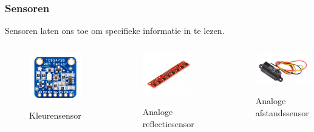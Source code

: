 \documentclass
   [kulak,aspectratio=169,<options>] %
   {kulakbeamer}
\begin{document}
\begin{frame}
	\frametitle{Sensoren}
	Sensoren laten ons toe om specifieke informatie in te lezen.
	\begin{columns}
		\begin{figure}
			\centering
			\includegraphics[width=.7\textwidth]{kleurensensor}
			\caption{Kleurensensor}\cite{TCS34725KleurSensorBOB}
		\end{figure}
		\begin{figure}
			\centering
			\includegraphics[width=.8\textwidth]{reflectiesensor}
			\caption{Analoge reflectiesensor}\cite{QTR-8AAnalogeReflexieSensorArray}
		\end{figure}
		\begin{figure}
			\centering
			\includegraphics[width=.9\textwidth]{afstandssensor}
			\caption{Analoge afstandssensor}\cite{AnalogeAfstandssensor}
		\end{figure}
	\end{columns}
	

\end{frame}
\end{document}
